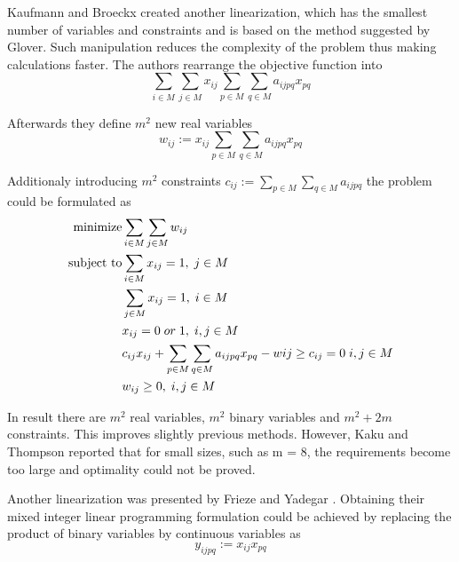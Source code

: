 Kaufmann and Broeckx \cite{kaufman1978algorithm} created another linearization, which has the smallest number of variables and constraints and is based on the method suggested by Glover.
Such manipulation reduces the complexity of the problem thus making calculations faster.
The authors rearrange the objective function into
\begin{equation}
  \sum_{i \in M} \sum_{j \in M} x_{ij} \sum_{p \in M} \sum_{q \in M} a_{ijpq} x_{pq}
\end{equation}

Afterwards they define $m^2$ new real variables
\begin{equation}
  w_{ij} := x_{ij}\sum_{p \in M} \sum_{q \in M} a_{ijpq} x_{pq}
\end{equation}

Additionaly introducing $m^2$ constraints $ c_{ij} := \sum_{p \in M} \sum_{q \in M} a_{ijpq} $ the problem could be formulated as
\begin{align}
  \text{minimize} &\null \sum_{i \in M} \sum_{j \in M} w_{ij}\\
  \text{subject to} &\null \sum_{i \in M} x_{ij} = 1, \; j \in M \\
  &\null \sum_{j \in M} x_{ij} = 1, \; i \in M \\
  &\null x_{ij} = 0 \; or \; 1, \; i, j \in M \\
  &\null c_{ij}x_{ij} + \sum_{p \in M} \sum_{q \in M} a_{ijpq}x_{pq} - w{ij} \geq c_{ij} = 0 \; i, j \in M \\
  &\null w_{ij} \geq 0, \; i, j \in M \\
\end{align}

In result there are $m^2$ real variables, $m^2$ binary variables and $m^2 + 2m$ constraints.
This improves slightly previous methods.
However, Kaku and Thompson \cite{kaku1986exact} reported that for small sizes, such as m = 8, the requirements become too large and optimality could not be proved.

Another linearization was presented by Frieze and Yadegar \cite{frieze1983quadratic}.
Obtaining their mixed integer linear programming formulation could be achieved by replacing the product of binary variables by continuous variables as
\begin{equation}
  y_{ijpq} := x_{ij} x_{pq}
\end{equation}

